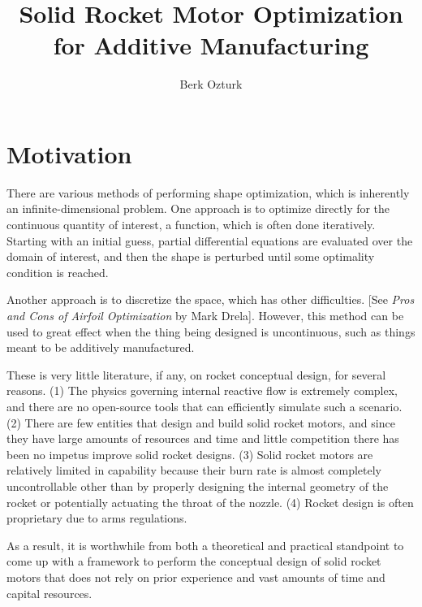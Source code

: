 \documentclass[12pt]{article}
\begin{document}
	
	
	
	\title{Solid Rocket Motor Optimization for Additive Manufacturing}
	\author{Berk Ozturk}
	
	\maketitle
	
	\section{Motivation}
	
There are various methods of performing shape optimization, which is inherently an infinite-dimensional problem. One approach is to optimize directly for the continuous quantity of interest, a function, which is often done iteratively. Starting with an initial guess, partial differential equations are evaluated over the domain of interest, and then the shape is perturbed until some optimality condition is reached. 

Another approach is to discretize the space, which has other difficulties. [See \textit{Pros and Cons of Airfoil Optimization} by Mark Drela]. However, this method can be used to great effect when the thing being designed is uncontinuous, such as things meant to be additively manufactured. 

These is very little literature, if any, on rocket conceptual design, for several reasons. (1) The physics governing internal reactive flow is extremely complex, and there are no open-source tools that can efficiently simulate such a scenario. (2) There are few entities that design and build solid rocket motors, and since they have large amounts of resources and time and little competition there has been no impetus improve solid rocket designs. (3) Solid rocket motors are relatively limited in capability because their burn rate is almost completely uncontrollable other than by properly designing the internal geometry of the rocket or potentially actuating the throat of the nozzle. (4) Rocket design is often proprietary due to arms regulations. 

As a result, it is worthwhile from both a theoretical and practical standpoint to come up with a framework to perform the conceptual design of solid rocket motors that does not rely on prior experience and vast amounts of time and capital resources. 
	
\end{document}
